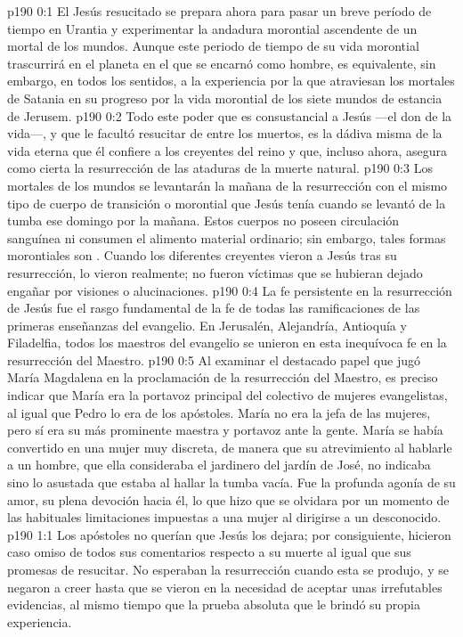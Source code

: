 \author{Comisión de seres intermedios}
\vs p190 0:1 El Jesús resucitado se prepara ahora para pasar un breve período de tiempo en Urantia y experimentar la andadura morontial ascendente de un mortal de los mundos. Aunque este periodo de tiempo de su vida morontial trascurrirá en el planeta en el que se encarnó como hombre, es equivalente, sin embargo, en todos los sentidos, a la experiencia por la que atraviesan los mortales de Satania en su progreso por la vida morontial de los siete mundos de estancia de Jerusem.
\vs p190 0:2 Todo este poder que es consustancial a Jesús ---el don de la vida---, y que le facultó resucitar de entre los muertos, es la dádiva misma de la vida eterna que él confiere a los creyentes del reino y que, incluso ahora, asegura como cierta la resurrección de las ataduras de la muerte natural.
\vs p190 0:3 Los mortales de los mundos se levantarán la mañana de la resurrección con el mismo tipo de cuerpo de transición o morontial que Jesús tenía cuando se levantó de la tumba ese domingo por la mañana. Estos cuerpos no poseen circulación sanguínea ni consumen el alimento material ordinario; sin embargo, tales formas morontiales son . Cuando los diferentes creyentes vieron a Jesús tras su resurrección, lo vieron realmente; no fueron víctimas que se hubieran dejado engañar por visiones o alucinaciones.
\vs p190 0:4 La fe persistente en la resurrección de Jesús fue el rasgo fundamental de la fe de todas las ramificaciones de las primeras enseñanzas del evangelio. En Jerusalén, Alejandría, Antioquía y Filadelfia, todos los maestros del evangelio se unieron en esta inequívoca fe en la resurrección del Maestro.
\vs p190 0:5 \pc Al examinar el destacado papel que jugó María Magdalena en la proclamación de la resurrección del Maestro, es preciso indicar que María era la portavoz principal del colectivo de mujeres evangelistas, al igual que Pedro lo era de los apóstoles. María no era la jefa de las mujeres, pero sí era su más prominente maestra y portavoz ante la gente. María se había convertido en una mujer muy discreta, de manera que su atrevimiento al hablarle a un hombre, que ella consideraba el jardinero del jardín de José, no indicaba sino lo asustada que estaba al hallar la tumba vacía. Fue la profunda agonía de su amor, su plena devoción hacia él, lo que hizo que se olvidara por un momento de las habituales limitaciones impuestas a una mujer al dirigirse a un desconocido.
\vs p190 1:1 Los apóstoles no querían que Jesús los dejara; por consiguiente, hicieron caso omiso de todos sus comentarios respecto a su muerte al igual que sus promesas de resucitar. No esperaban la resurrección cuando esta se produjo, y se negaron a creer hasta que se vieron en la necesidad de aceptar unas irrefutables evidencias, al mismo tiempo que la prueba absoluta que le brindó su propia experiencia.
